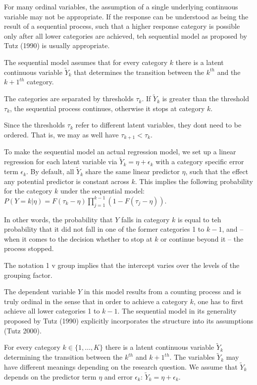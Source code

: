 For many ordinal variables, the assumption of a single underlying continuous variable may not be appropriate. If the response can be understood as being the result of a sequential process, such that a higher response category is possible only after all lower categories are achieved, teh sequential model as proposed by Tutz (1990) is usually appropriate.

The sequential model assumes that for every category $k$ there is a latent continuous variable $\tilde Y_{k}$ that determines the transition between the $k^{th}$ and the $k+1^{th}$ category.

The categories are separated by thresholds $\tau_{k}$. If $\tilde Y_{k}$ is greater than the threshold $\tau_{k}$, the sequential process continues, otherwise it stops at category $k$.

Since the thresholds $\tau_{k}$ refer to different latent variables, they dont need to be ordered. That is, we may as well have $\tau_{k+1} < \tau_{k}$.

To make the sequential model an actual regression model, we set up a linear regression for each latent variable via $\tilde Y_{k} = \eta + \epsilon_{k}$ with a category specific error term $\epsilon_{k}$. By default, all $\tilde Y_{k}$ share the same linear predictor $\eta$, such that the effect any potential predictor is constant across $k$. This implies the following probability for the category $k$ under the sequential model: $P(Y=k | \eta) = F(\tau_{k} - \eta) \prod_{j=1}^{k-1} ( 1 - F(\tau_{j} - \eta) )$.

In other words, the probability that $Y$ falls in category $k$ is equal to teh probability that it did not fall in one of the former categories 1 to $k-1$, and -- when it comes to the decision whether to stop at $k$ or continue beyond it -- the process stopped.

The notation 1 v group implies that the intercept varies over the levels of the grouping factor.

The dependent variable $Y$ in this model results from a counting process and is truly ordinal in the sense that in order to achieve a category $k$, one has to first achieve all lower categories 1 to $k-1$. The sequential model in its generality proposed by Tutz (1990) explicitly incorporates the structure into its assumptions (Tutz 2000).

For every category $k \in \{1, \ldots, K \}$ there is a latent continuous variable $\tilde Y_{k}$ determining the transition between the $k^{th}$ and $k+1^{th}$. The variables $\tilde Y_{k}$ may have different meanings depending on the research question. We assume that $\tilde Y_{k}$ depends on the predictor term $\eta$ and error $\epsilon_{k}$: $\tilde Y_{k} = \eta + \epsilon_{k}$.

